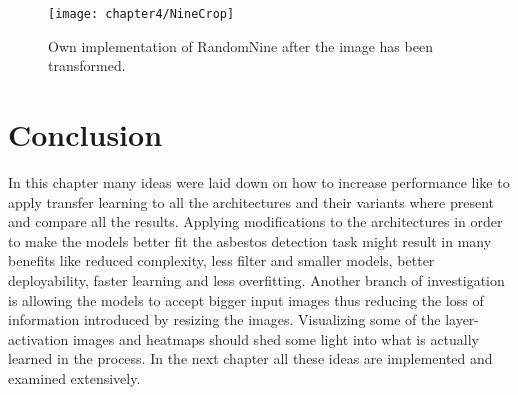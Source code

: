 \begin{figure}[!h]
  \centering
  \caption{Own implementation of RandomNine after the image has been transformed.}
  \texttt{[image: chapter4/NineCrop]}
  \label{fig:TenCrop}
\end{figure}


\section{Conclusion}

In this chapter many ideas were laid down on how to increase performance like to apply transfer learning to all the architectures and their variants where present and compare all the results. Applying modifications to the architectures in order to make the models better fit the asbestos detection task might result in many benefits like reduced complexity, less filter and smaller models, better deployability, faster learning and less overfitting. Another branch of investigation is allowing the models to accept bigger input images thus reducing the loss of information introduced by resizing the images. Visualizing some of the layer-activation images and heatmaps should shed some light into what is actually learned in the process. In the next chapter all these ideas are implemented and examined extensively.